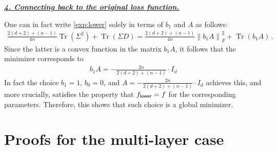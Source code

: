 \documentclass{article}
\newcommand{\bb}{A}
\newcommand{\cc}{b}
\newcommand{\ttf}{f_{\sf lower}}
\newcommand{\emphh}[1]{\textbf{\emph{#1}}}
\DeclareMathOperator{\tr}{Tr}
\newcommand{\norm}[1]{\left\| #1 \right\|}
\begin{document}
 \underline{\emphh{4. Connecting back to the original loss function.}}

One can in fact write \eqref{exp:lower} solely in terms of $\cc_1$ and $\bb$ as follows:
\begin{align}
    \frac{2(d+2) + (n-1)}{4n} \tr(\Sigma^2) + \tr(\Sigma D) = \frac{2(d+2) + (n-1)}{4n} \norm{\cc_1\bb}_F^2 + \tr(\cc_1\bb)\,.
\end{align}
Since the latter is a convex function in the matrix $\cc_1\bb$, it follows that the minimizer corresponds to 
\begin{align}
    \cc_1\bb = -\frac{2n}{2(d+2)+(n-1)} \cdot I_d
\end{align}
In fact the choice $\cc_1 = 1$, $\cc_0 =0$, and $\bb =  -\frac{2n}{2(d+2)+(n-1)} \cdot I_d$ achieves this, and more crucially, satisfies the property that $\ttf = f$ for the corresponding parameters. Therefore, this shows that such choice is a global minimizer.

 

\section{Proofs for the multi-layer case}
\label{a:foo}
\end{document}
